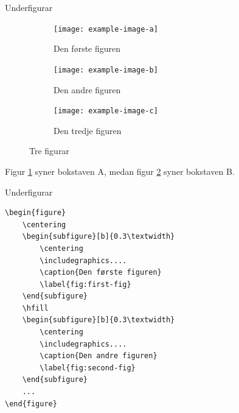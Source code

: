 \begin{frame}[containsverbatim]{Underfigurar}
	
	\begin{figure}
		\centering
		\begin{subfigure}[b]{0.3\textwidth}
			\centering
			\texttt{[image: example-image-a]}
			\caption{Den første figuren}
			\label{fig:first-fig}
		\end{subfigure}
		\hfill
		\begin{subfigure}[b]{0.3\textwidth}
			\centering
			\texttt{[image: example-image-b]}
			\caption{Den andre figuren}
			\label{fig:second-fig}
		\end{subfigure}
		\hfill
		\begin{subfigure}[b]{0.3\textwidth}
			\centering
			\texttt{[image: example-image-c]}
			\caption{Den tredje figuren}
			\label{fig:third-fig}
		\end{subfigure}
		\caption{Tre figurar}
		\label{fig:three-figures}
	\end{figure}
	
	Figur \ref{fig:first-fig} syner bokstaven A, medan figur \ref{fig:second-fig} syner bokstaven B.
	
\end{frame}


\begin{frame}[containsverbatim]{Underfigurar}
	
	\begin{verbatim}
\begin{figure}
	\centering
	\begin{subfigure}[b]{0.3\textwidth}
		\centering
		\includegraphics....
		\caption{Den første figuren}
		\label{fig:first-fig}
	\end{subfigure}
	\hfill
	\begin{subfigure}[b]{0.3\textwidth}
		\centering
		\includegraphics....
		\caption{Den andre figuren}
		\label{fig:second-fig}
	\end{subfigure}
	...
\end{figure}
	\end{verbatim}
	
	
	
	
\end{frame}


